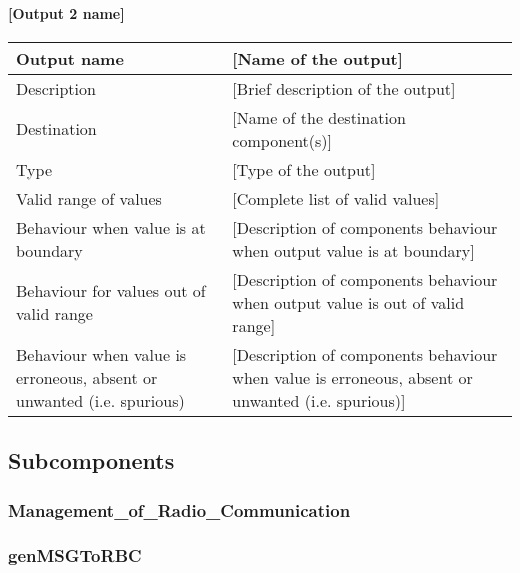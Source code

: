 \paragraph{[Output 2 name]}

\begin{longtable}{p{}p{}}
\toprule
Output name				& [Name of the output] \\
\midrule
Description				& [Brief description of the output] \\
\midrule
Destination				& [Name of the destination component(s)] \\ 
\midrule
Type					& [Type of the output] \\
\midrule
Valid range of values	& [Complete list of valid values] \\
\midrule
Behaviour when value is at boundary	& [Description of components behaviour when output value is at boundary] \\
\midrule
Behaviour for values out of valid range	& [Description of components behaviour when output value is out of valid range] \\
\midrule
Behaviour when value is erroneous, absent or unwanted (i.e. spurious) & [Description of components behaviour when value is erroneous, absent or unwanted (i.e. spurious)] \\
\bottomrule
\end{longtable}


\subsection{Subcomponents}\label{s:manage_radio_communication_subcomponents}


\subsubsection{Management\_of\_Radio\_Communication}


\subsubsection{genMSGToRBC}

